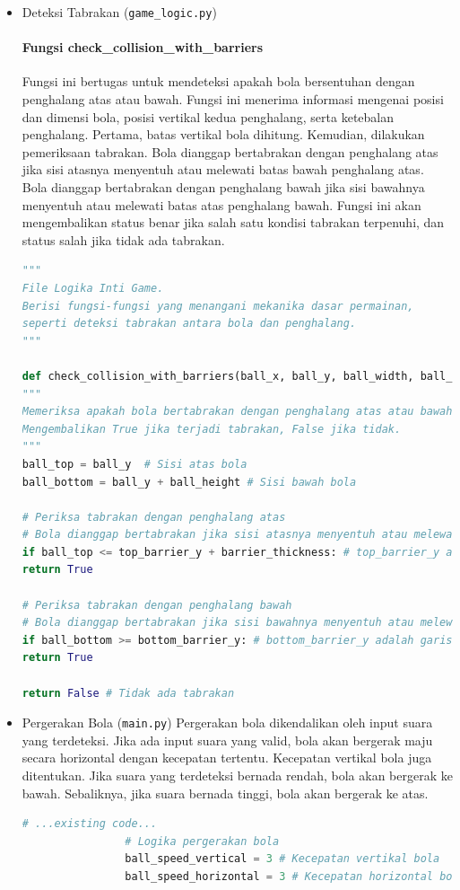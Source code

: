 \documentclass[11pt,a4paper]{article}
\begin{document}
\begin{itemize}
\item Deteksi Tabrakan (\texttt{game\_logic.py})

\paragraph{Fungsi check\_collision\_with\_barriers}
Fungsi ini bertugas untuk mendeteksi apakah bola bersentuhan dengan penghalang atas atau bawah. Fungsi ini menerima informasi mengenai posisi dan dimensi bola, posisi vertikal kedua penghalang, serta ketebalan penghalang. Pertama, batas vertikal bola dihitung. Kemudian, dilakukan pemeriksaan tabrakan. Bola dianggap bertabrakan dengan penghalang atas jika sisi atasnya menyentuh atau melewati batas bawah penghalang atas. Bola dianggap bertabrakan dengan penghalang bawah jika sisi bawahnya menyentuh atau melewati batas atas penghalang bawah. Fungsi ini akan mengembalikan status benar jika salah satu kondisi tabrakan terpenuhi, dan status salah jika tidak ada tabrakan.

\begin{lstlisting}[language=Python, caption=Fungsi check\_collision\_with\_barriers]
"""
File Logika Inti Game.
Berisi fungsi-fungsi yang menangani mekanika dasar permainan,
seperti deteksi tabrakan antara bola dan penghalang.
"""

def check_collision_with_barriers(ball_x, ball_y, ball_width, ball_height, top_barrier_y, bottom_barrier_y, barrier_thickness):
"""
Memeriksa apakah bola bertabrakan dengan penghalang atas atau bawah.
Mengembalikan True jika terjadi tabrakan, False jika tidak.
"""
ball_top = ball_y  # Sisi atas bola
ball_bottom = ball_y + ball_height # Sisi bawah bola

# Periksa tabrakan dengan penghalang atas
# Bola dianggap bertabrakan jika sisi atasnya menyentuh atau melewati sisi bawah penghalang atas
if ball_top <= top_barrier_y + barrier_thickness: # top_barrier_y adalah garis atas dari penghalang atas
return True

# Periksa tabrakan dengan penghalang bawah
# Bola dianggap bertabrakan jika sisi bawahnya menyentuh atau melewati sisi atas penghalang bawah
if ball_bottom >= bottom_barrier_y: # bottom_barrier_y adalah garis atas dari penghalang bawah
return True

return False # Tidak ada tabrakan
\end{lstlisting}
\item Pergerakan Bola (\texttt{main.py})
\newline Pergerakan bola dikendalikan oleh input suara yang terdeteksi. Jika ada input suara yang valid, bola akan bergerak maju secara horizontal dengan kecepatan tertentu. Kecepatan vertikal bola juga ditentukan. Jika suara yang terdeteksi bernada rendah, bola akan bergerak ke bawah. Sebaliknya, jika suara bernada tinggi, bola akan bergerak ke atas.
\begin{lstlisting}[language=Python, caption=Logika pergerakan bola]
# ...existing code...
                # Logika pergerakan bola
                ball_speed_vertical = 3 # Kecepatan vertikal bola
                ball_speed_horizontal = 3 # Kecepatan horizontal bola


\end{lstlisting}
\end{itemize}
\end{document}
